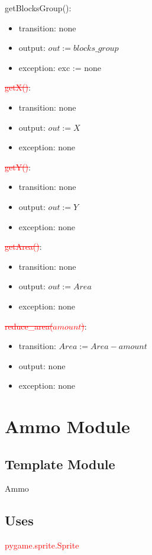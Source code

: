 \documentclass[12pt]{article}
\begin{document}
\noindent getBlocksGroup():
\begin{itemize}
\item transition: none
\item output: $out := \mathit{blocks\_group}$
\item exception: exc := none
\end{itemize}


\noindent \textcolor{red}{\st{getX()}}:
\begin{itemize}
\item transition: none
\item output: $out := X$
\item exception: none
\end{itemize}

\noindent \textcolor{red}{\st{getY()}}:
\begin{itemize}
\item transition: none
\item output: $out := Y$
\item exception: none
\end{itemize}

\noindent \textcolor{red}{\st{getArea()}}:
\begin{itemize}
\item transition: none
\item output: $out := Area$
\item exception: none
\end{itemize}

\noindent \textcolor{red}{\st{reduce\_area($\mathit{amount}$)}}:
\begin{itemize}
\item transition: $Area := Area - amount$ 
\item output: none
\item exception: none
\end{itemize}
\newpage

\section{Ammo Module}

\subsection*{Template Module}
Ammo

\subsection*{Uses}
\textcolor{red}{pygame.sprite.Sprite}
\end{document}

